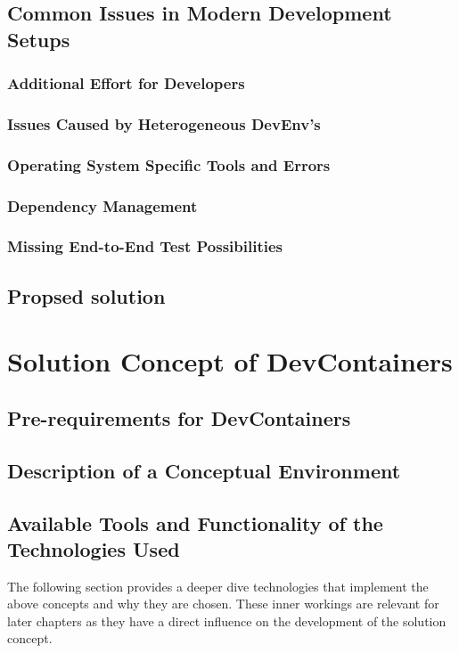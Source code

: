 \documentclass[12pt, a4paper]{article}
\begin{document}
    \subsection{Common Issues in Modern Development Setups}
        \subsubsection{Additional Effort for Developers}
        \subsubsection{Issues Caused by Heterogeneous \acs{DevEnv}'s}
        \subsubsection{Operating System Specific Tools and Errors}
        \subsubsection{Dependency Management}
        \subsubsection{Missing End-to-End Test Possibilities}
    \subsection{Propsed solution}

\section{Solution Concept of DevContainers}\label{sec::solution_concept}
    \subsection{Pre-requirements for DevContainers}
    \subsection{Description of a Conceptual Environment}
    \subsection{Available Tools and Functionality of the Technologies Used}
    The following section provides a deeper dive technologies that implement the above concepts and why they are chosen. These inner workings are relevant for later chapters as they have a direct influence on the development of the solution concept.
\end{document}
